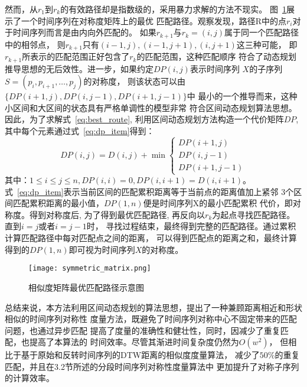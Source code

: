 然而，从$r_1$到$r_k$的有效路径却是指数级的，采用暴力求解的方法不现实。
图~\ref{fig:symmetric_matrix}展示了一个时间序列在对称度矩阵上的最优
匹配路径。观察发现，路径R中的点$r_i$对于时间序列而言是由内向外匹配的。
如果$r_{k+1}$与$r_k=\left(i,j\right)$属于同一个匹配路径中的相邻点，
则$r_{k+1}$只有$(i-1, j),(i-1, j+1),(i, j+1)$这三种可能，
即$r_{k+1}$所表示的匹配范围正好包含了$r_k$的匹配范围，这种匹配顺序
符合了动态规划推导思想的无后效性。进一步，如果约定$D P(i, j)$表示时间序列
$X$的子序列$S=\left(p_{i}, p_{i+1}, \dots, p_{j}\right)$的对称度，
则该状态可以由$\{D P(i+1, j), D P(i, j-1), D P(i+1, j-1)\}$中
最小的一个推导而来，这种小区间和大区间的状态具有严格单调性的模型非常
符合区间动态规划算法思想。因此，为了求解式~\ref{eq:best_route},
利用区间动态规划方法构造一个代价矩阵$DP$, 其中每个元素通过式~\ref{eq:dp_item}得到：
\begin{equation}
  D P(i, j)=D(i, j)+\min \left\{\begin{array}{c}
    D P(i+1, j) \\
    D P(i, j-1) \\
    D P(i+1, j-1)
  \end{array}\right.
  \label{eq:dp_item}
\end{equation}
其中：$1 \leq i \leq j \leq n, D P(i, i)=0, D P(i, i+1)=D(i, i+1)$。
式~\ref{eq:dp_item}表示当前区间的匹配累积距离等于当前点的距离值加上紧邻
3个区间匹配累积距离的最小值，$D P(1, n)$便是时间序列X的最小匹配累积
代价，即对称度。得到对称度后, 为了得到最优匹配路径,
再反向以$r_k$为起点寻找匹配路径。直到$i=j$或者$i=j-1$时，
寻找过程结束，最终得到完整的匹配路径。通过累积计算匹配路径中每对匹配点之间的距离，
可以得到匹配点的距离之和，最终计算得到的$DP(1,n)$即可视为时间序列$X$的对称度。
\begin{figure}
  \centering
  \texttt{[image: symmetric\_matrix.png]}
  \caption{相似度矩阵最优匹配路径示意图}
  \label{fig:symmetric_matrix}
\end{figure}

总结来说，本方法利用区间动态规划的算法思想，提出了一种兼顾距离相近和形状相似的时间序列对称性
度量方法，既避免了时间序列对称中心不固定带来的匹配问题，也通过异步匹配
提高了度量的准确性和健壮性，同时，因减少了重复匹配，也提高了本算法的
时间效率。尽管其渐进时间复杂度仍然为$O\left(w^{2}\right)$，
但相比于基于原始和反转时间序列的DTW距离的相似度度量算法，
减少了$50 \%$的重复匹配，并且在3.2节所述的分段时间序列对称性度量算法中
更加提升了对称子序列的计算效率。

